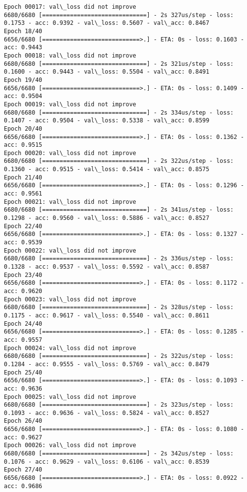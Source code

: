 \documentclass[11pt]{article}
\begin{document}
\begin{Verbatim}[commandchars=\\\{\}]
Epoch 00017: val\_loss did not improve
6680/6680 [==============================] - 2s 327us/step - loss: 0.1753 - acc: 0.9392 - val\_loss: 0.5607 - val\_acc: 0.8467
Epoch 18/40
6656/6680 [============================>.] - ETA: 0s - loss: 0.1603 - acc: 0.9443
Epoch 00018: val\_loss did not improve
6680/6680 [==============================] - 2s 321us/step - loss: 0.1600 - acc: 0.9443 - val\_loss: 0.5504 - val\_acc: 0.8491
Epoch 19/40
6656/6680 [============================>.] - ETA: 0s - loss: 0.1409 - acc: 0.9504
Epoch 00019: val\_loss did not improve
6680/6680 [==============================] - 2s 334us/step - loss: 0.1407 - acc: 0.9504 - val\_loss: 0.5338 - val\_acc: 0.8599
Epoch 20/40
6656/6680 [============================>.] - ETA: 0s - loss: 0.1362 - acc: 0.9515
Epoch 00020: val\_loss did not improve
6680/6680 [==============================] - 2s 322us/step - loss: 0.1360 - acc: 0.9515 - val\_loss: 0.5414 - val\_acc: 0.8575
Epoch 21/40
6656/6680 [============================>.] - ETA: 0s - loss: 0.1296 - acc: 0.9561
Epoch 00021: val\_loss did not improve
6680/6680 [==============================] - 2s 341us/step - loss: 0.1298 - acc: 0.9560 - val\_loss: 0.5886 - val\_acc: 0.8527
Epoch 22/40
6656/6680 [============================>.] - ETA: 0s - loss: 0.1327 - acc: 0.9539
Epoch 00022: val\_loss did not improve
6680/6680 [==============================] - 2s 336us/step - loss: 0.1328 - acc: 0.9537 - val\_loss: 0.5592 - val\_acc: 0.8587
Epoch 23/40
6656/6680 [============================>.] - ETA: 0s - loss: 0.1172 - acc: 0.9620
Epoch 00023: val\_loss did not improve
6680/6680 [==============================] - 2s 328us/step - loss: 0.1175 - acc: 0.9617 - val\_loss: 0.5540 - val\_acc: 0.8611
Epoch 24/40
6656/6680 [============================>.] - ETA: 0s - loss: 0.1285 - acc: 0.9557
Epoch 00024: val\_loss did not improve
6680/6680 [==============================] - 2s 322us/step - loss: 0.1284 - acc: 0.9555 - val\_loss: 0.5769 - val\_acc: 0.8479
Epoch 25/40
6656/6680 [============================>.] - ETA: 0s - loss: 0.1093 - acc: 0.9636
Epoch 00025: val\_loss did not improve
6680/6680 [==============================] - 2s 323us/step - loss: 0.1093 - acc: 0.9636 - val\_loss: 0.5824 - val\_acc: 0.8527
Epoch 26/40
6656/6680 [============================>.] - ETA: 0s - loss: 0.1080 - acc: 0.9627
Epoch 00026: val\_loss did not improve
6680/6680 [==============================] - 2s 342us/step - loss: 0.1076 - acc: 0.9629 - val\_loss: 0.6106 - val\_acc: 0.8539
Epoch 27/40
6656/6680 [============================>.] - ETA: 0s - loss: 0.0922 - acc: 0.9686

\end{Verbatim}
\end{document}
